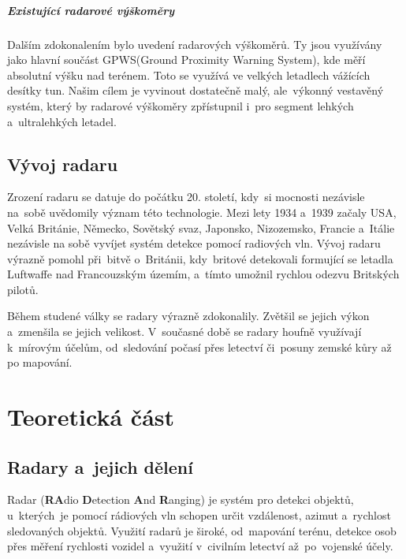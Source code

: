 		\paragraph{Existující radarové výškoměry}
		Dalším zdokonalením bylo uvedení radarových výškoměrů. Ty jsou využívány jako hlavní součást GPWS(Ground Proximity Warning System), kde měří absolutní výšku nad terénem. Toto se využívá ve velkých letadlech vážících desítky tun. Našim cílem je vyvinout dostatečně malý, ale~výkonný vestavěný systém, který by radarové výškoměry zpřístupnil i~pro segment lehkých a~ultralehkých letadel.
	
	\section{Vývoj radaru}
		Zrození radaru se datuje do počátku 20. století, kdy~si mocnosti nezávisle na~sobě uvědomily význam této technologie. Mezi lety 1934 a~1939 začaly USA, Velká Británie, Německo, Sovětský svaz, Japonsko, Nizozemsko, Francie a~Itálie nezávisle na sobě vyvíjet systém detekce pomocí radiových vln.\cite{history::radar} Vývoj radaru výrazně pomohl při~bitvě o~Británii, kdy~britové detekovali formující se letadla Luftwaffe nad Francouzským územím, a~tímto umožnil rychlou odezvu Britských pilotů.\par
			
		Během studené války se radary výrazně zdokonalily. Zvětšil se jejich výkon a~zmenšila se jejich velikost. V~současné době se radary houfně využívají k~mírovým účelům, od~sledování počasí přes letectví či~posuny zemské kůry až po mapování.
		
\chapter{Teoretická část}
	
	\section{Radary a~jejich dělení}\label{uvod::radary}
		Radar (\textbf{RA}dio \textbf{D}etection \textbf{A}nd \textbf{R}anging) je systém pro detekci objektů, u~kterých~je pomocí rádiových vln schopen určit vzdálenost, azimut a~rychlost sledovaných objektů. Využití radarů je široké, od~mapování terénu, detekce osob přes měření rychlosti vozidel a~využití v~civilním letectví až~po~vojenské účely.	
			
